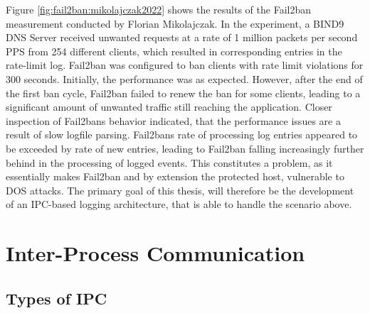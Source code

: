 Figure \ref{fig:fail2ban:mikolajczak2022} shows the results of the Fail2ban measurement conducted by Florian Mikolajczak. In the experiment, a BIND9 DNS Server received unwanted requests at a rate of 1 million packets per second \ac{PPS} from 254 different clients,
which resulted in corresponding entries in the rate-limit log. Fail2ban was configured to ban clients with rate limit violations for 300 seconds. Initially, the performance was as expected. However, after 
the end of the first ban cycle, Fail2ban failed to renew the ban for some clients, leading to a significant amount of unwanted traffic still reaching the application. Closer inspection of Fail2bans behavior indicated,
that the performance issues are a result of slow logfile parsing. Fail2bans rate of processing log entries appeared to be exceeded by rate of new entries, leading to Fail2ban falling increasingly further behind
in the processing of logged events. This constitutes a problem, as it essentially makes Fail2ban and by extension the protected host, vulnerable to \ac{DOS} attacks. The primary goal of this thesis, will therefore be the development 
of an \ac{IPC}-based logging architecture, that is able to handle the scenario above.          


\section{Inter-Process Communication}
\label{sec:ipc}

\subsection{Types of IPC}
\label{sec:ipc_types}

